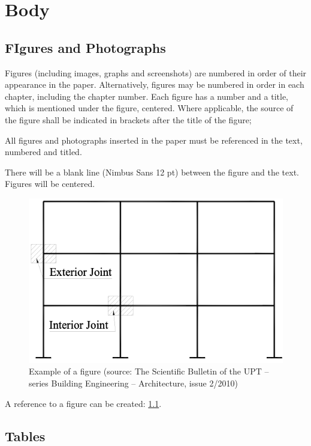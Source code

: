 \chapter{Body}
\thispagestyle{pagestyle}

\section{FIgures and Photographs}

Figures (including images, graphs and screenshots) are numbered in order of their appearance in the paper. Alternatively, figures may be numbered in order in each chapter, including the chapter number. Each figure has a number and a title, which is mentioned under the figure, centered. Where applicable, the source of the figure shall be indicated in brackets after the title of the figure;

All figures and photographs inserted in the paper must be referenced in the text, numbered and titled.

There will be a blank line (Nimbus Sans 12 pt) between the figure and the text. Figures will be centered.

\begin{figure}[h]
\includegraphics{images/Picture 1.png}
\caption{Example of a figure (source: The Scientific Bulletin of the UPT – series Building Engineering – Architecture, issue 2/2010)}
\label{fig:myfig}
\end{figure}

A reference to a figure can be created: \cref{fig:myfig}. 

\section{Tables}

